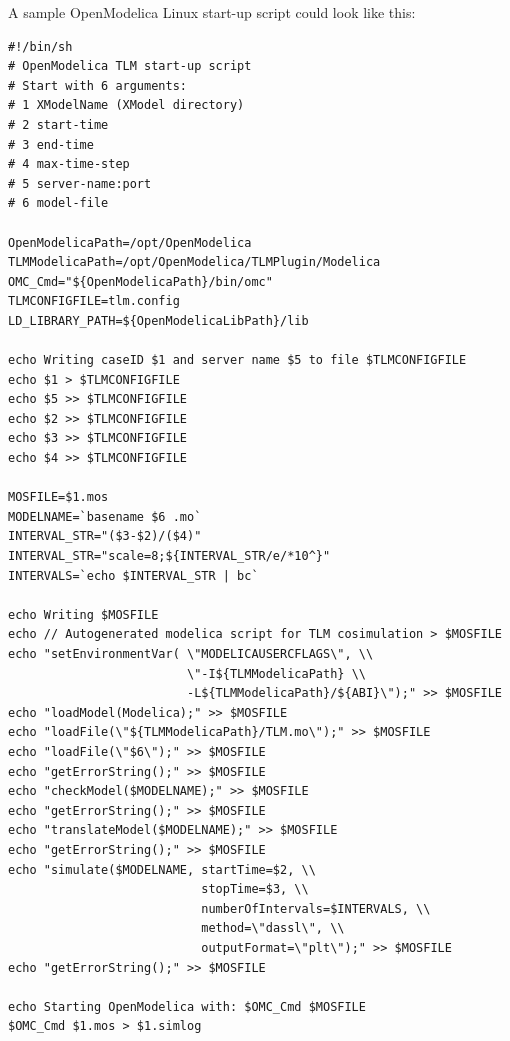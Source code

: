 \noindent A sample OpenModelica Linux start-up script could look like this:
{\scriptsize
\begin{verbatim}
#!/bin/sh
# OpenModelica TLM start-up script
# Start with 6 arguments:
# 1 XModelName (XModel directory)
# 2 start-time
# 3 end-time
# 4 max-time-step
# 5 server-name:port
# 6 model-file

OpenModelicaPath=/opt/OpenModelica
TLMModelicaPath=/opt/OpenModelica/TLMPlugin/Modelica
OMC_Cmd="${OpenModelicaPath}/bin/omc"
TLMCONFIGFILE=tlm.config
LD_LIBRARY_PATH=${OpenModelicaLibPath}/lib

echo Writing caseID $1 and server name $5 to file $TLMCONFIGFILE
echo $1 > $TLMCONFIGFILE
echo $5 >> $TLMCONFIGFILE
echo $2 >> $TLMCONFIGFILE
echo $3 >> $TLMCONFIGFILE
echo $4 >> $TLMCONFIGFILE

MOSFILE=$1.mos
MODELNAME=`basename $6 .mo`
INTERVAL_STR="($3-$2)/($4)"
INTERVAL_STR="scale=8;${INTERVAL_STR/e/*10^}"
INTERVALS=`echo $INTERVAL_STR | bc`

echo Writing $MOSFILE
echo // Autogenerated modelica script for TLM cosimulation > $MOSFILE
echo "setEnvironmentVar( \"MODELICAUSERCFLAGS\", \\
                         \"-I${TLMModelicaPath} \\
                         -L${TLMModelicaPath}/${ABI}\");" >> $MOSFILE
echo "loadModel(Modelica);" >> $MOSFILE
echo "loadFile(\"${TLMModelicaPath}/TLM.mo\");" >> $MOSFILE
echo "loadFile(\"$6\");" >> $MOSFILE
echo "getErrorString();" >> $MOSFILE
echo "checkModel($MODELNAME);" >> $MOSFILE
echo "getErrorString();" >> $MOSFILE
echo "translateModel($MODELNAME);" >> $MOSFILE
echo "getErrorString();" >> $MOSFILE
echo "simulate($MODELNAME, startTime=$2, \\
                           stopTime=$3, \\
                           numberOfIntervals=$INTERVALS, \\
                           method=\"dassl\", \\
                           outputFormat=\"plt\");" >> $MOSFILE
echo "getErrorString();" >> $MOSFILE

echo Starting OpenModelica with: $OMC_Cmd $MOSFILE
$OMC_Cmd $1.mos > $1.simlog

\end{verbatim}
}

